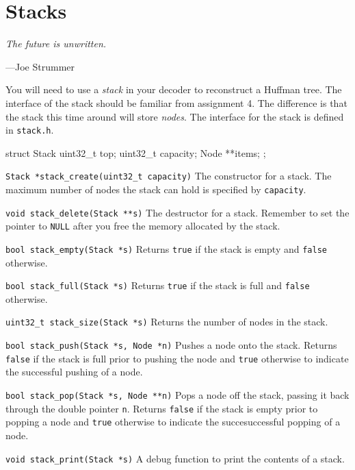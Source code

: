 \section{Stacks}
\textwidth
\epigraph{\emph{The future is unwritten.}}{---Joe Strummer}

You will need to use a \emph{stack} in your decoder to reconstruct a
Huffman tree. The interface of the stack should be familiar from
assignment 4. The difference is that the stack this time around will
store \emph{nodes}. The interface for the stack is defined in
\texttt{stack.h}.

\begin{clisting}{}
struct Stack {
    uint32_t top;
    uint32_t capacity;
    Node **items;
};
\end{clisting}

\begin{funcdoc}{\texttt{Stack *stack\_create(uint32\_t capacity)}}
  The constructor for a stack. The maximum number of nodes the stack can
  hold is specified by \texttt{capacity}.
\end{funcdoc}

\begin{funcdoc}{\texttt{void stack\_delete(Stack **s)}}
  The destructor for a stack. Remember to set the pointer to \texttt{NULL}
  after you free the memory allocated by the stack.
\end{funcdoc}

\begin{funcdoc}{\texttt{bool stack\_empty(Stack *s)}}
  Returns \texttt{true} if the stack is empty and \texttt{false}
  otherwise.
\end{funcdoc}

\begin{funcdoc}{\texttt{bool stack\_full(Stack *s)}}
  Returns \texttt{true} if the stack is full and \texttt{false} otherwise.
\end{funcdoc}

\begin{funcdoc}{\texttt{uint32\_t stack\_size(Stack *s)}}
  Returns the number of nodes in the stack.
\end{funcdoc}

\begin{funcdoc}{\texttt{bool stack\_push(Stack *s, Node *n)}}
  Pushes a node onto the stack. Returns \texttt{false} if the stack is
  full prior to pushing the node and \texttt{true} otherwise to indicate
  the successful pushing of a node.
\end{funcdoc}

\begin{funcdoc}{\texttt{bool stack\_pop(Stack *s, Node **n)}}
  Pops a node off the stack, passing it back through the double pointer
  \texttt{n}. Returns \texttt{false} if the stack is empty prior to
  popping a node and \texttt{true} otherwise to indicate the
  succesuccessful popping of a node.
\end{funcdoc}

\begin{funcdoc}{\texttt{void stack\_print(Stack *s)}}
  A debug function to print the contents of a stack.
\end{funcdoc}
